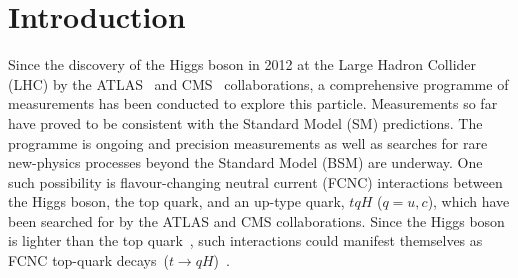 \section{Introduction}
\label{sec:intro}
Since the discovery of the Higgs boson in 2012 at the Large Hadron Collider (LHC) by the ATLAS~\cite{Aad:2012tfa} and 
CMS~\cite{Chatrchyan:2012ufa} collaborations, 
a comprehensive programme of measurements %
has been conducted to explore this particle. Measurements so far have proved to be consistent with the Standard Model (SM) predictions. 
The programme is ongoing and precision measurements as well as searches for rare new-physics processes beyond the Standard Model (BSM)
are underway. One such possibility is flavour-changing neutral current (FCNC) interactions between the Higgs boson, 
the top quark, and an up-type quark, $tqH$ ($q=u, c$), which have been searched for by the ATLAS and CMS collaborations.  
Since the Higgs boson is lighter than the top quark~\cite{Aad:2015zhl},
such interactions could manifest themselves as FCNC top-quark decays~($t\to qH$)~\cite{Agashe:2013hma}.

